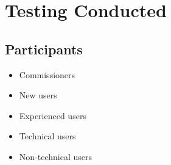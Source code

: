 \documentclass{article}
\begin{document}
\section{Testing Conducted}
    \subsection{Participants}
    \begin{itemize}
        \item Commissioners
        \item New users
        \item Experienced users
        \item Technical users
        \item Non-technical users
    \end{itemize}
    
\end{document}
